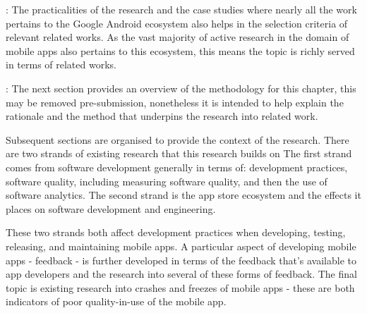 
: 
The practicalities of the research and the case studies where nearly all the work pertains to the Google Android ecosystem also helps in the selection criteria of relevant related works. As the vast majority of active research in the domain of mobile apps also pertains to this ecosystem, this means the topic is richly served in terms of related works.

:
The next section provides an overview of the methodology for this chapter, this may be removed pre-submission, nonetheless it is intended to help explain the rationale and the method that underpins the research into related work.

Subsequent sections are organised to provide the context of the research. There are two strands of existing research that this research builds on The first strand comes from software development generally in terms of: development practices, software quality, including measuring software quality, and then the use of software analytics. The second strand is the app store ecosystem and the effects it places on software development and engineering.

These two strands both affect development practices when developing, testing, releasing, and maintaining mobile apps. A particular aspect of developing mobile apps - feedback - is further developed in terms of the feedback that's available to app developers and the research into several of these forms of feedback. The final topic is existing research into crashes and freezes of mobile apps - these are both indicators of poor quality-in-use of the mobile app.

